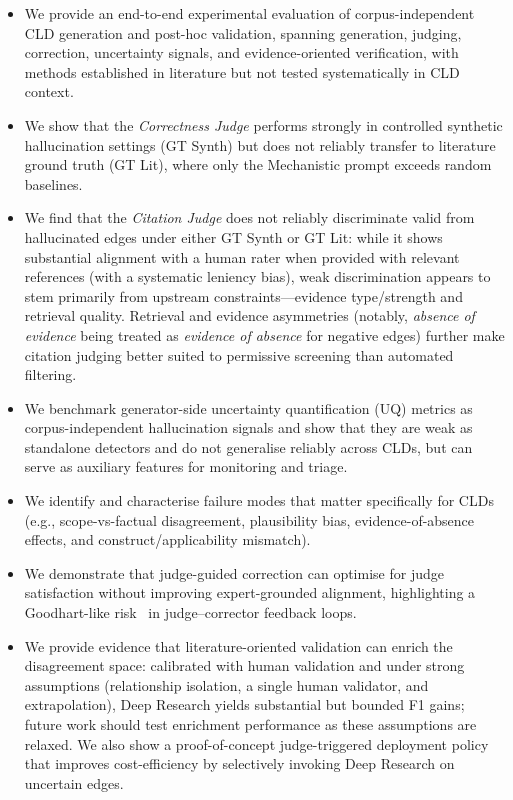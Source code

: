 \begin{itemize}[noitemsep]
    \item We provide an end-to-end experimental evaluation of corpus-independent CLD generation and post-hoc validation, spanning generation, judging, correction, uncertainty signals, and evidence-oriented verification, with methods established in literature but not tested systematically in CLD context.
    \item We show that the \textit{Correctness Judge} performs strongly in controlled synthetic hallucination settings (GT Synth) but does not reliably transfer to literature ground truth (GT Lit), where only the Mechanistic prompt exceeds random baselines.
    \item We find that the \textit{Citation Judge} does not reliably discriminate valid from hallucinated edges under either GT Synth or GT Lit: while it shows substantial alignment with a human rater when provided with relevant references (with a systematic leniency bias), weak discrimination appears to stem primarily from upstream constraints---evidence type/strength and retrieval quality. Retrieval and evidence asymmetries (notably, \textit{absence of evidence} being treated as \textit{evidence of absence} for negative edges) further make citation judging better suited to permissive screening than automated filtering.
    \item We benchmark generator-side uncertainty quantification (UQ) metrics as corpus-independent hallucination signals and show that they are weak as standalone detectors and do not generalise reliably across CLDs, but can serve as auxiliary features for monitoring and triage.
    \item We identify and characterise failure modes that matter specifically for CLDs (e.g., scope-vs-factual disagreement, plausibility bias, evidence-of-absence effects, and construct/applicability mismatch).
    \item We demonstrate that judge-guided correction can optimise for judge satisfaction without improving expert-grounded alignment, highlighting a Goodhart-like risk~\citep{goodhart1984problems} in judge--corrector feedback loops.
    \item We provide evidence that literature-oriented validation can enrich the disagreement space: calibrated with human validation and under strong assumptions (relationship isolation, a single human validator, and extrapolation), Deep Research yields substantial but bounded F1 gains; future work should test enrichment performance as these assumptions are relaxed. We also show a proof-of-concept judge-triggered deployment policy that improves cost-efficiency by selectively invoking Deep Research on uncertain edges.
\end{itemize}

